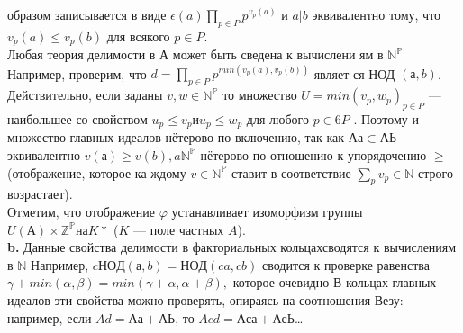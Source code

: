 \documentclass{mai_book}
\begin{document}
образом записывается в виде $\epsilon(a) \prod_{p\in P}p^{v_{p}(a)}$ и $a | b$ эквивалентно тому,\linebreak
что $v_p(a) \leqslant v_{p}(b)$ для всякого $p \in P$.\\
\hspace*{0pt}Любая теория делимости в А может быть сведена к вычислени­\linebreak
ям в $\mathbb{N^{P}}$ Например, проверим, что $d = \prod_{p \in P} p^{min(v_{p}(a),v_{p}(b))}$ являет­\linebreak
ся НОД $(а, b)$. Действительно, если заданы $v, w \in \mathbb{N^{P}}$ то множество \linebreak
$U = min(v_p, w_p)_{p \in P}$ --- наибольшее со свойством $u_p \leqslant v_p и u_p \leqslant w_p$\linebreak
для любого $p \in6 P$ . Поэтому и множество главных идеалов нётерово \linebreak
по включению, так как $Аа \subset АЬ$ эквивалентно $v(а) \geqslant v(b), a \mathbb{N^{P}}$\linebreak
нётерово по отношению к упорядочению $\geqslant$ (отображение, которое ка­\linebreak
ждому $v \in \mathbb{N^{P}}$ ставит в соответствие $\sum_{p}v_p \in \mathbb{N}$ строго возрастает).\\
\hspace*{0pt} Отметим, что отображение $\varphi$ устанавливает изоморфизм группы\linebreak
$U(А) \times \mathbb{Z^{P}} на K*$ ($K$ — поле частных $A$).\\
\hspace*{15pt}\textbf{b.} Данные свойства делимости в факториальных кольцах\linebreak сводятся
к вычислениям в $\mathbb{N}$ Например, $cНОД(а, b) = НОД (ca,cb)$ сводится к\linebreak
проверке равенства $\gamma+min(\alpha, \beta) = min(\gamma+\alpha, \alpha+\beta),$ которое очевидно\linebreak
В кольцах главных идеалов эти свойства можно проверять, опираясь на\linebreak
соотношения Везу: например, если $Ad = Аа+АЬ$, то $Acd = Аса+АсЬ$\ldots
\end{document}
